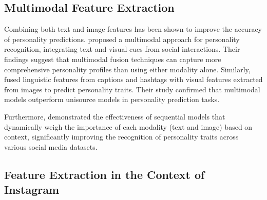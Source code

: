\begin{comment}
To discuss the comparison between different image feature extraction, \citet{Qawasmeh_Oh_Kwigizile_2025} has provided a number of results according to the feature. For the feature "Road Type", AlexNet was proven to have the highest mean accuracy (84\%) and mean F-score (84\%) among VGG-19 and ResNet50. For the feature "Intersection Angle", AlexNet still holds the highest mean accuracy (85\%), and the highest mean F-score (84\%). \citet{Qiu_Lu_Wang_Chen_Chen_Yang_2024}'s study about image recognition of tomato leaf diseases had modified AlexNet model to fit the number of types of tomato leaf images. It beat the original AlexNet model modelled from \citet{Krizhevsky_Sutskever_Hinton_2017}, which has the accuracy of 87\%, recall of 93.24\%, precision of 92.57\% and F-score of 92.90\%. The modified AlexNet from \citet{Qiu_Lu_Wang_Chen_Chen_Yang_2024} has the highest accuracy of 98.72\%, recall of 98.91\%, precision of 99.77\% and F-score of 99.34\%.
\end{comment}

\subsection{Multimodal Feature Extraction}

Combining both text and image features has been shown to improve the accuracy of personality predictions. \citet{batrinca_multimodal_2016} proposed a multimodal approach for personality recognition, integrating text and visual cues from social interactions. Their findings suggest that multimodal fusion techniques can capture more comprehensive personality profiles than using either modality alone. Similarly, \citet{Skowron2016} fused linguistic features from captions and hashtags with visual features extracted from images to predict personality traits. Their study confirmed that multimodal models outperform unisource models in personality prediction tasks.

Furthermore, \citet{Lima2022b} demonstrated the effectiveness of sequential models that dynamically weigh the importance of each modality (text and image) based on context, significantly improving the recognition of personality traits across various social media datasets.

\subsection{Feature Extraction in the Context of Instagram}

